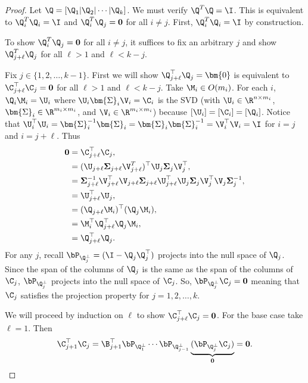 \begin{proof}
        Let $\Q = [\Q_1 |\Q_2 | \cdots | \Q_k]$. We must verify $\Q^T \Q = \I$. This is equivalent to $\Q_i^T\Q_i = \I$ and $\Q_i^T\Q_j = \mathbf{0}$ for all $i\neq j$. First, $\Q_i^T\Q_i = \I$ by construction.    

        To show $\Q_i^T\Q_j = \mathbf{0}$ for all $i\neq j$, it suffices to fix an arbitrary $j$ and show $\Q_{j+\ell}^T\Q_j$ for all $\ell > 1$ and $\ell < k-j$. 
        
        Fix $j \in \{1,2,\dots,k-1\}$. First we will show $\Q_{j+\ell}^\top\Q_j = \bm{0}$ is equivalent to $\C_{j+\ell}^\top\C_{j}= \mathbf{0}$ for all $\ell > 1$ and $\ell < k-j$.  Take $\M_i \in O(m_i)$. For each $i$, $\Q_i \M_i = \U_i$ where $\U_i \bm{\Sigma}_i \V_i = \C_i$ is the SVD (with $\U_i \in \R^{n \times m_i}$, $\bm{\Sigma}_i \in \R^{m_i \times m_i}$, and $\V_i \in \R^{m_i \times m_i}$) because $[\U_i] = [\C_i] = [\Q_i]$. Notice that $\U_i^\top \U_i = \bm{\Sigma}_i^{-1}\bm{\Sigma}_i= \bm{\Sigma}_i\bm{\Sigma}_i^{-1} = \V_i^\top \V_i = \I$ for $i=j$ and $i=j+\ell$. Thus
        \begin{align*}
            \mathbf{0} &= \C_{j+\ell}^\top\C_{j}, \\
            &= (\U_{j+\ell} \mathbf{\Sigma}_{j+\ell} \V_{j+\ell}^T)^\top\U_{j} \mathbf{\Sigma}_{j} \V_{j}^\top, \\
            &= \mathbf{\Sigma}_{j+\ell}^{-1} \V_{j+\ell}^\top \V_{j+\ell} \mathbf{\Sigma}_{j+\ell} \U_{j+\ell}^\top \U_{j} \mathbf{\Sigma}_j \V_j^\top \V_j \mathbf{\Sigma}_j^{-1},\\
            &= \U_{j+\ell}^\top \U_j, \\
            &= (\Q_{j+\ell}\M_i)^\top (\Q_j\M_i),\\
            &= \M_i^\top \Q_{j+\ell}^\top \Q_j\M_i,\\
            &= \Q_{j+\ell}^\top \Q_j.
        \end{align*}
        For any $j$, recall $\bP_{\Q_j^\perp} = (\I - \Q_j \Q_j^\top)$ projects into the null space of $\Q_j$. Since the span of the columns of $\Q_j$ is the same as the span of the columns of $\C_j$, $\bP_{\Q_j^\perp}$ projects into the null space of $\C_j$. So, $\bP_{\Q_j^\perp} \C_j= \mathbf{0}$ meaning that $\C_j$ satisfies the projection property for $j=1,2,\dots,k$.
            
        We will proceed by induction on $\ell$ to show $\C_{j + \ell}^\top\C_j = \mathbf{0}$. For the base case take $\ell = 1$. Then
        \begin{equation}
            \C_{j + 1}^\top\C_j = \B_{j + 1}^\top\bP_{\Q_1^\perp} \cdots \bP_{\Q_{j-1}^\perp}\underbrace{(\bP_{\Q_j^\perp}\C_j)}_{\mathbf{0}} = \mathbf{0}.
        \end{equation}
        

\end{proof}
